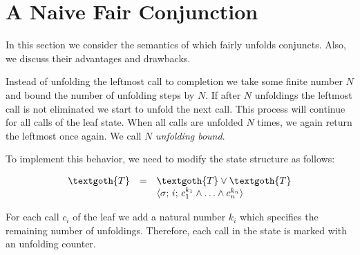 \section{A Naive Fair Conjunction}
\label{sec:naive}

In this section we consider the semantics of \mk which fairly unfolds conjuncts. Also, we discuss their advantages and drawbacks.

Instead of unfolding the leftmost call to completion we take some finite number $N$ and bound the number of unfolding steps by $N$. If after $N$ unfoldings the leftmost
call is not eliminated we start to unfold the next call. This process will continue for all calls of the leaf state. When all calls are unfolded $N$ times, we again return the leftmost once
again. We call $N$ \emph{unfolding bound}.


To implement this behavior, we need to modify the state structure as follows:

\[
\begin{array}{rcl}
  \textgoth{T} &=& \textgoth{T} \lor \textgoth{T} \\
               & &\inbr{\sigma;\, i;\, c_1^{k_1} \land \ldots \land c_n^{k_n}} 
\end{array}
\]

For each call $c_i$ of the leaf we add a natural number $k_i$ which specifies the remaining number of unfoldings. Therefore, each call in the state is marked with an unfolding counter. 


